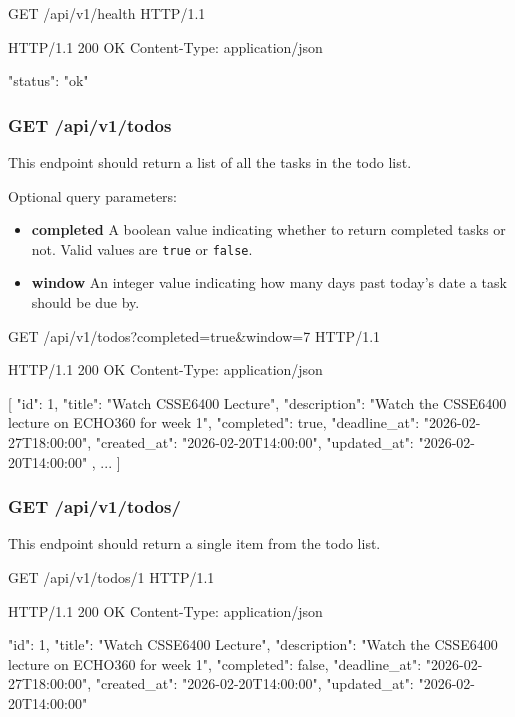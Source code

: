 \documentclass{csse4400}
\begin{document}
\begin{code}[language=json,numbers=none]{}
GET /api/v1/health HTTP/1.1
\end{code}
\begin{code}[language=json,numbers=none]{}
HTTP/1.1 200 OK
Content-Type: application/json

{
  "status": "ok"
}
\end{code}

\subsubsection{GET /api/v1/todos}
This endpoint should return a list of all the tasks in the todo list.

Optional query parameters:
\begin{itemize}
\item \textbf{completed} A boolean value indicating whether to return completed tasks or not. Valid values are \texttt{true} or \texttt{false}.
  \item\textbf{window} An integer value indicating how many days past today's date a task should be due by.
\end{itemize}

\begin{code}[language=json,numbers=none]{}
GET /api/v1/todos?completed=true&window=7 HTTP/1.1
\end{code}
\begin{code}[language=json,numbers=none]{}
HTTP/1.1 200 OK
Content-Type: application/json

[
    {
      "id": 1,
      "title": "Watch CSSE6400 Lecture",
      "description": "Watch the CSSE6400 lecture on ECHO360 for week 1",
      "completed": true,
      "deadline_at": "2026-02-27T18:00:00",
      "created_at": "2026-02-20T14:00:00",
      "updated_at": "2026-02-20T14:00:00"
    },
    ...
]
\end{code}

\subsubsection{GET /api/v1/todos/}
This endpoint should return a single item from the todo list.

\begin{code}[language=json,numbers=none]{}
GET /api/v1/todos/1 HTTP/1.1
\end{code}
\begin{code}[language=json,numbers=none]{}
HTTP/1.1 200 OK
Content-Type: application/json

{
    "id": 1,
    "title": "Watch CSSE6400 Lecture",
    "description": "Watch the CSSE6400 lecture on ECHO360 for week 1",
    "completed": false,
    "deadline_at": "2026-02-27T18:00:00",
    "created_at": "2026-02-20T14:00:00",
    "updated_at": "2026-02-20T14:00:00"
}
\end{code}
\end{document}
